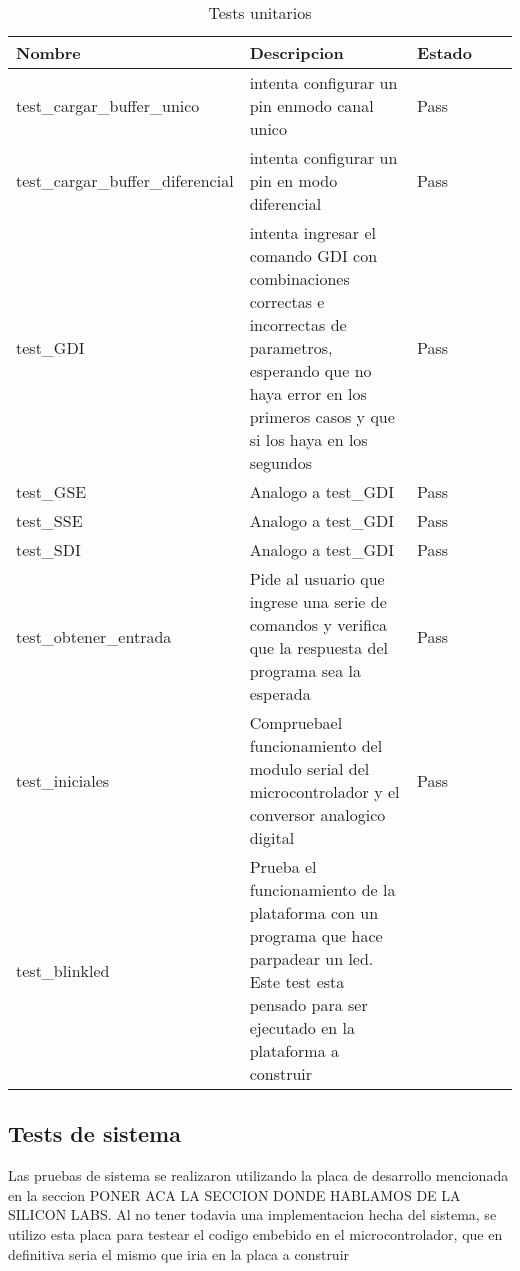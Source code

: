 \begin{table}[h]
\caption{Tests unitarios}
\label{it2:sub:tests_unitarios}
\begin{tabular}{|l|l|
>{\columncolor[HTML]{67FD9A}}l |ll}
\hline
\cellcolor[HTML]{68CBD0}Nombre & \cellcolor[HTML]{68CBD0}Descripcion & \cellcolor[HTML]{68CBD0}Estado &  &  \\ \hline
test\_cargar\_buffer\_unico & intenta configurar un pin enmodo canal unico & {\color[HTML]{009901} Pass} &  &  \\ \cline{1-3}
test\_cargar\_buffer\_diferencial & intenta configurar un pin en modo diferencial & {\color[HTML]{009901} Pass} &  &  \\ \cline{1-3}
test\_GDI & intenta ingresar el comando GDI con combinaciones correctas e incorrectas de parametros, esperando que no haya error en los primeros casos y que si los haya en los segundos & {\color[HTML]{009901} Pass} &  &  \\ \hline
test\_GSE & Analogo a test\_GDI & {\color[HTML]{009901} Pass} &  &  \\ \cline{1-3}
test\_SSE & Analogo a test\_GDI & {\color[HTML]{009901} Pass} &  &  \\ \cline{1-3}
test\_SDI & Analogo a test\_GDI & {\color[HTML]{009901} Pass} &  &  \\ \cline{1-3}
test\_obtener\_entrada & Pide al usuario que ingrese una serie de comandos y verifica que la respuesta del programa sea la esperada & {\color[HTML]{009901} Pass} &  &  \\ \cline{1-3}
test\_iniciales & Compruebael funcionamiento del modulo serial del microcontrolador y el conversor analogico digital & {\color[HTML]{009901} Pass} &  &  \\ \cline{1-3}
test\_blinkled & Prueba el funcionamiento de la plataforma con un programa que hace parpadear un led. Este test esta pensado para ser ejecutado en la plataforma a construir & \cellcolor[HTML]{FF9E9E}{\color[HTML]{CB0000} Fail} &  &  \\ \cline{1-3}
\end{tabular}
\end{table}


\subsection{Tests de sistema} %
\label{it2:sub:tests_de_sistema}

Las pruebas de sistema se realizaron utilizando la placa de desarrollo mencionada en la seccion PONER ACA LA SECCION DONDE HABLAMOS DE LA SILICON LABS. Al no tener todavia una implementacion hecha del sistema, se utilizo esta placa para testear el codigo embebido en el microcontrolador, que en definitiva seria el mismo que iria en la placa a construir

